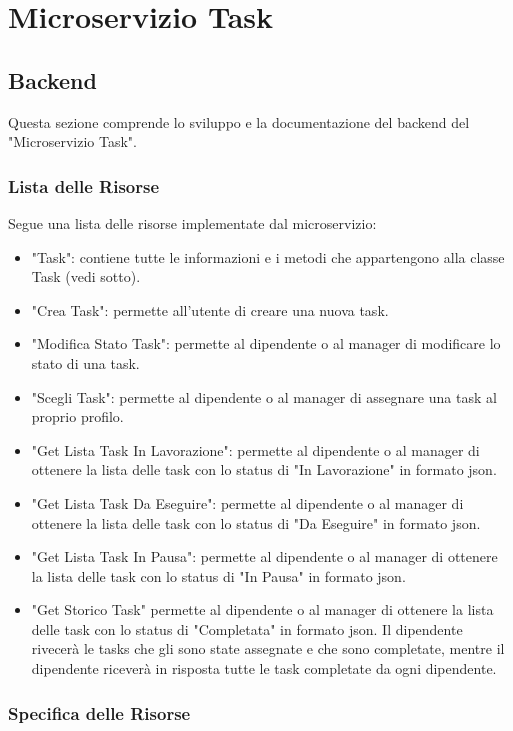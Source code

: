 \documentclass{report}
\begin{document}
\chapter{Microservizio Task}

\section{Backend}

Questa sezione comprende lo sviluppo e la documentazione del backend del
"Microservizio Task".

\subsection{Lista delle Risorse}

Segue una lista delle risorse implementate dal microservizio:
\begin{itemize}
	\item "Task": contiene tutte le informazioni e i metodi che appartengono alla classe Task (vedi sotto).
	\item "Crea Task": permette all'utente di creare una nuova task.
	\item "Modifica Stato Task": permette al dipendente o al manager di modificare lo stato di una task.
	\item "Scegli Task": permette al dipendente o al manager di assegnare una task al proprio profilo.
	\item "Get Lista Task In Lavorazione": permette al dipendente o al manager di ottenere la lista delle task con lo status di "In Lavorazione" in formato json.
	\item "Get Lista Task Da Eseguire": permette al dipendente o al manager di ottenere la lista delle task con lo status di "Da Eseguire" in formato json.
	\item "Get Lista Task In Pausa": permette al dipendente o al manager di ottenere la lista delle task con lo status di "In Pausa" in formato json.
	\item "Get Storico Task" permette al dipendente o al manager di ottenere la lista delle task con lo status di "Completata" in formato json. Il dipendente rivecerà le tasks che gli sono state assegnate e che sono completate, mentre il dipendente riceverà in risposta tutte le task completate da ogni dipendente.
\end{itemize}

\subsection{Specifica delle Risorse}
\end{document}
